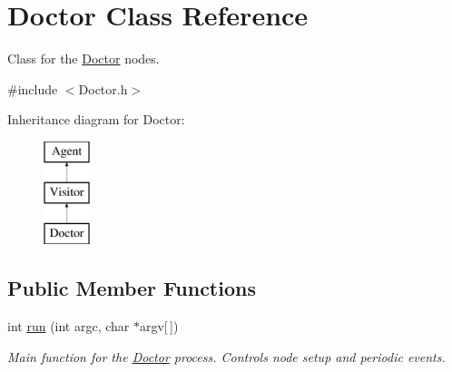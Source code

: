 \hypertarget{classDoctor}{\section{Doctor Class Reference}
\label{classDoctor}
}


Class for the \hyperlink{classDoctor}{Doctor} nodes.  




{\ttfamily \#include $<$Doctor.\-h$>$}

Inheritance diagram for Doctor\-:\begin{figure}[H]
\begin{center}
\leavevmode
\includegraphics[height=3.000000cm]{classDoctor}
\end{center}
\end{figure}
\subsection*{Public Member Functions}
\begin{DoxyCompactItemize}
\item 
\hypertarget{classDoctor_ac7ddd6ea1ee23cd67e8badcc29d2d7cd}{int \hyperlink{classDoctor_ac7ddd6ea1ee23cd67e8badcc29d2d7cd}{run} (int argc, char $\ast$argv\mbox{[}$\,$\mbox{]})}\label{classDoctor_ac7ddd6ea1ee23cd67e8badcc29d2d7cd}

\begin{DoxyCompactList}\small\item\em Main function for the \hyperlink{classDoctor}{Doctor} process. Controls node setup and periodic events. \end{DoxyCompactList}\end{DoxyCompactItemize}
